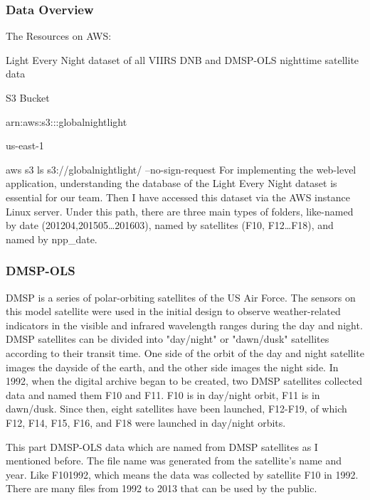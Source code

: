 \documentclass[conference]{IEEEtran}
\begin{document}
\subsubsection{Data Overview}
	
The Resources on AWS\cite{WorldBan13:online}: 
	
	
Light Every Night dataset of all VIIRS DNB and DMSP-OLS nighttime satellite data
	
	
S3 Bucket
	
	
arn:aws:s3:::globalnightlight
	
	
us-east-1
	
	
aws s3 ls s3://globalnightlight/ --no-sign-request
For implementing the web-level application, understanding the database of the Light Every Night dataset is essential 
for our team. Then I have accessed this dataset via the AWS instance Linux server. 
Under this path, there are three main types of folders, like-named by date (201204,201505…201603), named by satellites 
(F10, F12…F18), and named by npp\_date.

\subsubsection{DMSP-OLS}

	DMSP is a series of polar-orbiting satellites of the US Air Force. The sensors on this model satellite were used in the 
	initial design to observe weather-related indicators in the visible and infrared wavelength ranges during the day and night. 
	DMSP satellites can be divided into "day/night" or "dawn/dusk" satellites according to their transit time. One side of the 
	orbit of the day and night satellite images the dayside of the earth, and the other side images the night side. In 1992, when 
	the digital archive began to be created, two DMSP satellites collected data and named them F10 and F11. F10 is in day/night 
	orbit, F11 is in dawn/dusk. Since then, eight satellites have been launched, F12-F19, of which F12, F14, F15, F16, and F18 
	were launched in day/night orbits.
	
	This part DMSP-OLS data which are named from DMSP satellites as I mentioned before. The file name was generated from the 
	satellite's name and year. Like F101992, which means the data was collected by satellite F10 in 1992. There are many files 
	from 1992 to 2013 that can be used by the public.
\end{document}
